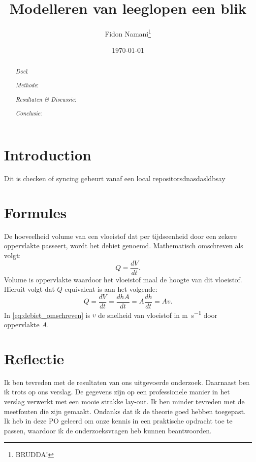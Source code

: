 \documentclass[numbers=endperiod]{scrartcl}
\title{Modelleren van leeglopen een blik}
\author{Fidon Namani\thanks{BRUDDA!}}
\date{\today}
\begin{document}
\maketitle
\begin{abstract}
    \textit{Doel}:

    \textit{Methode}:

    \textit{Resultaten \& Discussie}:

    \textit{Conclusie}:
\end{abstract}
\section{Introduction}
Dit is checken of syncing gebeurt vanaf een local repositorsdnasdasldbsay

\section{Formules}

De hoeveelheid volume van een vloeistof dat per tijdseenheid door een zekere oppervlakte passeert, wordt het debiet genoemd. Mathematisch omschreven als volgt:
\begin{equation}\label{eq:debiet}
    Q = \frac{dV}{dt}.
\end{equation}
Volume is oppervlakte waardoor het vloeistof maal de hoogte van dit vloeistof. Hieruit volgt dat $Q$ equivalent is aan het volgende:
\begin{equation}\label{eq:debiet_omschreven}
    Q = \frac{dV}{dt} = \frac{dhA}{dt} = A\frac{dh}{dt} = Av.
\end{equation}
In \cref{eq:debiet_omschreven} is $v$ de snelheid van vloeistof in \si{\meter\per\second} door oppervlakte $A$.

\newpage
\section{Reflectie}
Ik ben tevreden met de resultaten van ons uitgevoerde onderzoek. Daarnaast
ben ik trots op ons verslag. De gegevens zijn op een professionele
manier in het verslag verwerkt met een mooie strakke lay-out. Ik ben minder
tevreden met de meetfouten die zijn gemaakt. Ondanks dat ik de theorie
goed hebben toegepast. Ik heb in deze PO geleerd om onze kennis in
een praktische opdracht toe te passen, waardoor ik de onderzoeksvragen
heb kunnen beantwoorden.

\newpage
\appendix
\end{document}
